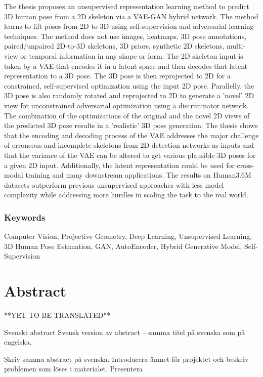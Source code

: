 The thesis proposes an unsupervised representation learning method to predict 3D human pose from a 2D skeleton via a VAE-GAN hybrid network. The method learns to lift poses from 2D to 3D using self-supervision and adversarial learning techniques. The method does not use images, heatmaps, 3D pose annotations, paired/unpaired 2D-to-3D skeletons, 3D priors, synthetic 2D skeletons, multi-view or temporal information in any shape or form. The 2D skeleton input is taken by a VAE that encodes it in a latent space and then decodes that latent representation to a 3D pose. The 3D pose is then reprojected to 2D for a constrained, self-supervised optimization using the input 2D pose. Parallelly, the 3D pose is also randomly rotated and reprojected to 2D to generate a 'novel' 2D view for unconstrained adversarial optimization using a discriminator network. The combination of the optimizations of the original and the novel 2D views of the predicted 3D pose results in a 'realistic' 3D pose generation. The thesis shows that the encoding and decoding process of the VAE addresses the major challenge of erroneous and incomplete skeletons from 2D detection networks as inputs and that the variance of the VAE can be altered to get various plausible 3D poses for a given 2D input. Additionally, the latent representation could be used for cross-modal training and many downstream applications. The results on Human3.6M datasets outperform previous unsupervised approaches with less model complexity while addressing more hurdles in scaling the task to the real world.


\subsection*{Keywords}
Computer Vision, Projective Geometry, Deep Learning, Unsupervised Learning, 3D Human Pose Estimation, GAN, AutoEncoder, Hybrid Generative Model, Self-Supervision

\newpage
\thispagestyle{plain}
\chapter*{Abstract} 
**YET TO BE TRANSLATED**


Svenskt abstract 
Svensk version av abstract – samma titel på svenska som på engelska.

Skriv samma abstract på svenska. Introducera ämnet för projektet och beskriv problemen som löses i materialet. Presentera 

